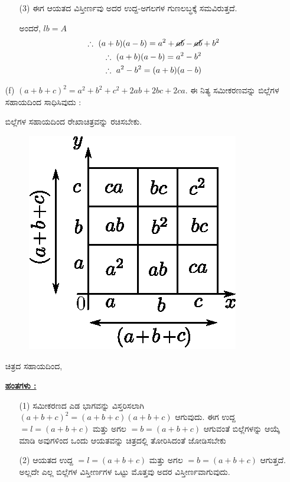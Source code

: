 \begin{enumerate}
\begin{itemize}
\item[(3)] ಈಗ ಆಯತದ ವಿಸ್ತೀರ್ಣವು ಅದರ ಉದ್ದ-ಅಗಲಗಳ ಗುಣಲಬ್ಧಕ್ಕೆ ಸಮವಿರುತ್ತದೆ.

ಅಂದರೆ, $lb = A$
\begin{gather*}
\therefore~ (a+b)(a-b) = a^2 + \cancel{ab} - \cancel{ab} + b^2\\
\therefore~ (a+b)(a-b) = a^2 - b^2\\
\therefore~ a^2 - b^2 = (a+b)(a-b)
\end{gather*}

\end{itemize}

\item[(f)] $(a+b+c)^2 = a^2 + b^2 + c^2 + 2ab + 2bc + 2ca.$ ಈ ನಿತ್ಯ ಸಮೀಕರಣವನ್ನು ಬಿಲ್ಲೆಗಳ ಸಹಾಯದಿಂದ ಸಾಧಿಸಿವುದು :

ಬಿಲ್ಲೆಗಳ ಸಹಾಯದಿಂದ ರೇಖಾಚಿತ್ರವನ್ನು ರಚಿಸಬೇಕು.
\begin{figure}[H]
\centering
\includegraphics[scale=0.8]{src/figure/chap3/fig3-32f.eps}
\end{figure}
ಚಿತ್ರದ ಸಹಾಯದಿಂದ,

\noindent
{\textbf{\underline{ಹಂತಗಳು :}}}
\begin{itemize}
\item[(1)] ಸಮೀಕರಣದ ಎಡ ಭಾಗವನ್ನು ವಿಸ್ತರಿಸಲಾಗಿ $(a+b+c)^2 = (a+b+c)(a+b+c)$ ಆಗುವುದು. ಈಗ ಉದ್ದ $= l = (a+b+c)$ ಮತ್ತು ಅಗಲ $= b = (a+b+c)$ ಆಗುವಂತೆ ಬಿಲ್ಲೆಗಳನ್ನು ಆಯ್ಕೆ ಮಾಡಿ ಅವುಗಳಿಂದ ಒಂದು ಆಯತವನ್ನು ಚಿತ್ರದಲ್ಲಿ ತೋರಿಸಿದಂತೆ ಜೋಡಿಸಬೇಕು
\item[(2)] ಆಯತದ ಉದ್ದ $= l = (a+b+c)$ ಮತ್ತು ಅಗಲ $= b = (a+b+c)$ ಆಗುತ್ತದೆ. ಅಲ್ಲದೇ ಎಲ್ಲ ಬಿಲ್ಲೆಗಳ ವಿಸ್ತೀರ್ಣಗಳ ಒಟ್ಟು ಮೊತ್ತವು ಅದರ ವಿಸ್ತೀರ್ಣವಾಗುವುದು. 


\end{itemize}
\end{enumerate}
